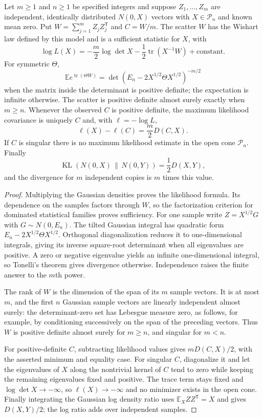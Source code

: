 \begin{theorem}
\label{final:M4}
Let $m\geq1$ and $n\geq1$ be specified integers and suppose
$Z_1,\ldots,Z_m$ are independent, identically distributed
$N(0,X)$ vectors with $X\in\mathcal P_n$ and known mean zero.  Put
$W=\sum_{j=1}^mZ_jZ_j^{\mathsf T}$ and $C=W/m$.  The scatter $W$ has
the Wishart law defined by this model and is a sufficient statistic
for $X$, with
\[
 \log L(X)=-\frac m2\log\det X
              -\frac12\operatorname{tr}(X^{-1}W)+\text{constant}.
\]
For symmetric $\Theta$,
\[
 \mathbb E e^{\operatorname{tr}(\Theta W)}
   =\det(E_n-2X^{1/2}\Theta X^{1/2})^{-m/2}
\]
when the matrix inside the determinant is positive definite; the
expectation is infinite otherwise.  The scatter is positive definite
almost surely exactly when $m\geq n$.  Whenever the observed $C$ is
positive definite, the maximum likelihood covariance is uniquely $C$
and, with $\ell=-\log L$,
\[
 \ell(X)-\ell(C)=\frac m2D(C,X).
\]
If $C$ is singular there is no maximum likelihood estimate in the
open cone $\mathcal P_n$.  Finally
\[
 \operatorname{KL}(N(0,X)\,\|\,N(0,Y))=\frac12D(X,Y),
\]
and the divergence for $m$ independent copies is $m$ times this value.
\end{theorem}

\begin{proof}
Multiplying the Gaussian densities proves the likelihood formula.
Its dependence on the samples factors through $W$, so the
factorization criterion for dominated statistical families proves
sufficiency.  For one sample write $Z=X^{1/2}G$ with $G\sim N(0,E_n)$.
The tilted Gaussian integral has quadratic form
$E_n-2X^{1/2}\Theta X^{1/2}$.  Orthogonal diagonalization reduces it
to one-dimensional integrals, giving its inverse square-root
determinant when all eigenvalues are positive.  A zero or negative
eigenvalue yields an infinite one-dimensional integral, so Tonelli's
theorem gives divergence otherwise.  Independence raises the finite
answer to the $m$th power.

The rank of $W$ is the dimension of the span of its $m$ sample vectors.
It is at most $m$, and the first $n$ Gaussian sample vectors are linearly
independent almost surely: the determinant-zero set has Lebesgue measure
zero, as follows, for example, by conditioning successively on the span
of the preceding vectors. Thus $W$ is positive definite almost surely
for $m\geq n$, and singular for $m<n$.

For positive-definite $C$, subtracting likelihood values gives
$mD(C,X)/2$, with the asserted minimum and equality case. For singular
$C$, diagonalize it and let the eigenvalues of $X$ along the nontrivial
kernel of $C$ tend to zero while keeping the remaining eigenvalues fixed
and positive. The trace term stays fixed and $\log\det X\to-\infty$,
so $\ell(X)\to-\infty$ and no minimizer exists in the open cone.
Finally integrating the Gaussian log
density ratio uses $\mathbb E_X ZZ^{\mathsf T}=X$ and gives $D(X,Y)/2$;
the log ratio adds over independent samples.
\end{proof}

